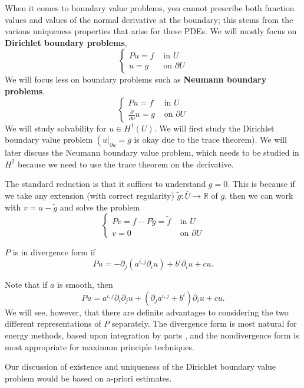 When it comes to boundary value problems, you cannot prescribe both function values and values of the normal derivative at the boundary; this stems from the various uniqueness properties that arise for these PDEs. We will mostly focus on \textbf{Dirichlet boundary problems},
$$
\begin{cases}
    P u=f & \text { in } U 
    \\ u=g & \text { on } \partial U
\end{cases}
$$
We will focus less on boundary problems such as \textbf{Neumann boundary problems},
$$
\begin{cases}
    P u=f & \text { in } U \\ 
    \frac{\partial}{\partial \nu} u=g & \text { on } \partial U
\end{cases}
$$
We will study solvability for $u \in H^{1}(U)$. We will first study the Dirichlet boundary value problem $\left(\left.u\right|_{\partial u}=g\right.$ is okay due to the trace theorem). We will later discuss the Neumann boundary value problem, which needs to be studied in $H^{2}$ because we need to use the trace theorem on the derivative.

The standard reduction is that it suffices to understand $g=0$. This is because if we take any extension (with correct regularity) $\widetilde{g}: \bar{U} \rightarrow \mathbb{R}$ of $g$, then we can work with $v=u - \widetilde{g}$ and solve the problem
$$
\begin{cases}
    P v=f-P \widetilde{g}=\widetilde{f} & \text { in } U 
    \\ v=0 & \text { on } \partial U
\end{cases}
$$

\begin{definition}
\label{def: Divergence form}
$P$ is in divergence form if
$$
P u=-\partial_{j}\left(a^{i, j} \partial_{i} u\right)+ b^{i}\partial_i u +c u  .
$$
\end{definition}

Note that if $a$ is smooth, then
$$
Pu=a^{i, j} \partial_{i} \partial_{j}u+\left(\partial_{j} a^{i, j}+b^{i}\right) \partial_{i} u+cu. 
$$
We will see, however, that there are definite advantages to considering the two different representations of $ P $ separately. The divergence form is most natural for energy methods, based upon integration by parts , and the nondivergence form is most appropriate for maximum principle techniques. 

Our discussion of existence and uniqueness of the Dirichlet boundary value problem would be based on a-priori estimates. 

